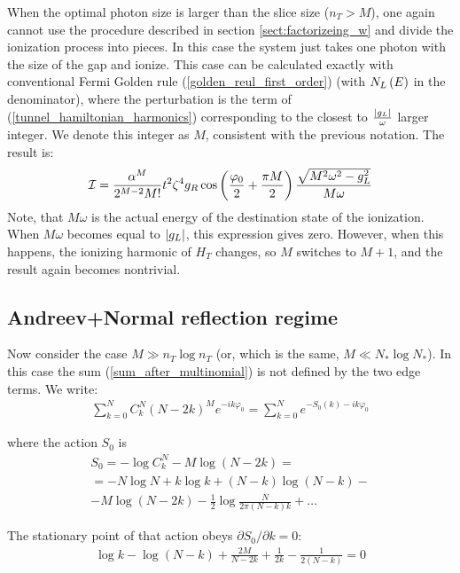 When the optimal photon size is larger than the slice size ($ n_T>M $), one again cannot use the procedure described in section \ref{sect:factorizeing_w} and divide the ionization process into pieces. In this case the system just takes one photon with the size of the gap and ionize. This case can be calculated exactly with conventional Fermi Golden rule (\ref{golden_reul_first_order}) (with $ N_L\left(E\right) $ in the denominator), where the perturbation is the term of (\ref{tunnel_hamiltonian_harmonics}) corresponding to the closest to $ \frac{\left|g_L\right|}{\omega} $ larger integer. We denote this integer as $ M $,  consistent with the previous notation. The result is:
\begin{gather}
\label{final_ioniztion_single_photon}
	\mathcal{I}
	=
	\frac
	{\alpha^M}{2^{M-2}M!}
	t^2\zeta^4
	g_R
	\cos
	\left(
		\frac{\varphi_0}{2}
		+
		\frac{\pi M}{2}
	\right)
	\frac
	{\sqrt{M^2\omega^2-g_L^2}}
	{M\omega}
\end{gather}
Note, that $ M\omega $ is the actual energy of the destination state of the ionization. When $ M\omega $ becomes equal to $ \left|g_L\right| $, this expression gives zero. However, when this happens,  the ionizing harmonic of $ H_T $ changes, so $ M $ switches to $ M+1 $, and the result again becomes nontrivial.
\subsection{Andreev+Normal reflection regime}

Now consider the case $M\gg n_T\log n_T$ (or, which is the same, $ M\ll N_*\log N_* $).
In this case the sum (\ref{sum_after_multinomial}) is not defined by the two edge terms.
We write:
\begin{gather}
\sum_{k=0}^{N}C_{k}^{N}(N-2k)^{M}e^{-ik\varphi_0}=\sum_{k=0}^{N}e^{-S_{0}(k)-ik\varphi_0}
\end{gather}

where the action $S_{0}$ is 
\begin{multline}
S_{0}=-\log C_{k}^{N}-M\log(N-2k)
=
\\
=
-N\log N+k\log k+(N-k)\log(N-k)-
\\
-M\log(N-2k)-\frac{1}{2}\log\frac{N}{2\pi(N-k)k}+\dots
\end{multline}

The stationary point of that action obeys $\partial S_{0}/\partial k=0$:
\begin{gather}
	\log k-\log(N-k)+\frac{2M}{N-2k}+\frac{1}{2k}-\frac{1}{2(N-k)}=0
\end{gather}


